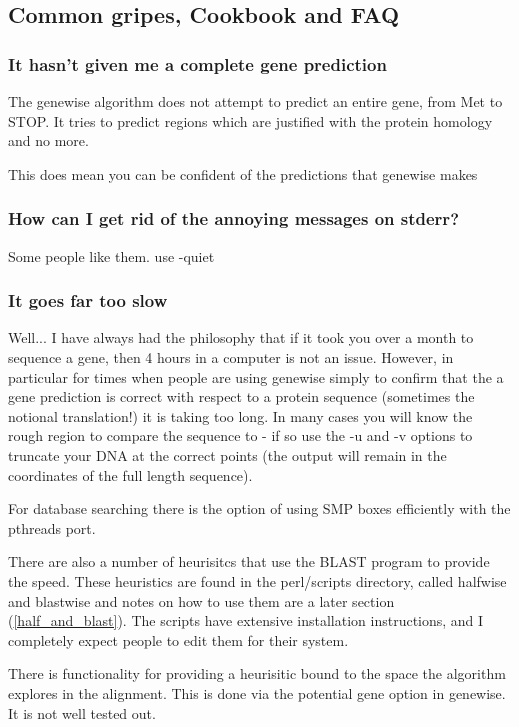\documentclass{article}
\begin{document}
\subsection{Common gripes, Cookbook and FAQ}

\subsubsection{It hasn't given me a complete gene prediction}

The genewise algorithm does not attempt to predict an entire gene,
from Met to STOP. It tries to predict regions which are justified with the
protein homology and no more.

This does mean you can be confident of the predictions that genewise makes

\subsubsection{How can I get rid of the annoying messages on stderr?}

Some people like them. use -quiet

\subsubsection{It goes far too slow} 

Well... I have always had the philosophy that if it took you over a month
to sequence a gene, then 4 hours in a computer is not an issue. However, in 
particular for times when people are using genewise simply to confirm
that the a gene prediction is correct with respect to a protein sequence
(sometimes the notional translation!) it is taking too long. In many cases
you will know the rough region to compare the sequence to - if so use the -u
and -v options to truncate your DNA at the correct points (the output will
remain in the coordinates of the full length sequence).

For database searching there is the option of using SMP boxes efficiently
with the pthreads port.

There are also a number of heurisitcs that use the BLAST program to
provide the speed. These heuristics are found in the perl/scripts
directory, called halfwise and blastwise and notes on how to use them
are a later section (\ref{half_and_blast}). The scripts have extensive
installation instructions, and I completely expect people to edit them
for their system.

There is functionality for providing a heurisitic bound to the space the
algorithm explores in the alignment. This is done via the potential
gene option in genewise. It is not well tested out.
\end{document}
